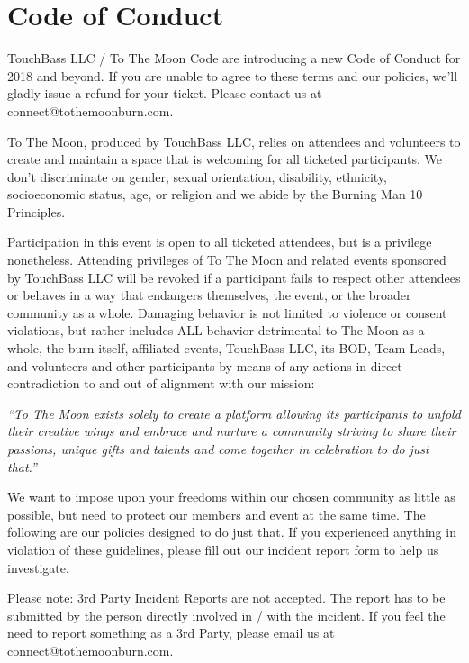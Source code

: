 \section*{Code of Conduct}\label{coc}
TouchBass LLC / To The Moon Code are introducing a new Code of Conduct for 2018 and beyond.
If you are unable to agree to these terms and our policies, we’ll gladly issue a refund for your ticket.
Please contact us at connect@tothemoonburn.com. 


\begin{multicols}{2}
To The Moon, produced by TouchBass LLC, relies on attendees and volunteers to create and maintain a space that is welcoming for all ticketed participants. We don’t discriminate on gender, sexual orientation, disability, ethnicity, socioeconomic status, age, or religion and we abide by the Burning Man 10 Principles.

Participation in this event is open to all ticketed attendees, but is a privilege nonetheless. Attending privileges of To The Moon and related events sponsored by TouchBass LLC will be revoked if a participant fails to respect other attendees or behaves in a way that endangers themselves, the event, or the broader community as a whole.
Damaging behavior is not limited to violence or consent violations, but rather includes ALL behavior detrimental to The Moon as a whole, the burn itself, affiliated events, TouchBass LLC, its BOD, Team Leads, and volunteers and other participants by means of any actions in direct contradiction to and out of alignment with our mission:

\emph{“To The Moon exists solely to create a platform allowing its participants to unfold their creative wings and embrace and nurture a community striving to share their passions, unique gifts and talents and come together in celebration to do just that.”}

We want to impose upon your freedoms within our chosen community as little as possible, but need to protect our members and event at the same time.
The following are our policies designed to do just that.
If you experienced anything in violation of these guidelines, please fill out our incident report form to help us investigate.

Please note: 3rd Party Incident Reports are not accepted. The report has to be submitted by the person directly involved in / with the incident. If you feel the need to report something as a 3rd Party, please email us at connect@tothemoonburn.com.


\end{multicols}
